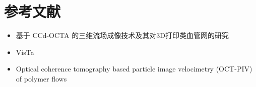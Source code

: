 \documentclass[12pt]{article}
\begin{document}
\section{参考文献}

\begin{itemize}
    \item 基于 CCd-OCTA 的三维流场成像技术及其对3D打印类血管网的研究 
    \item VisTa
    \item Optical coherence tomography based particle image velocimetry (OCT-PIV) of polymer flows
\end{itemize}
\end{document}
